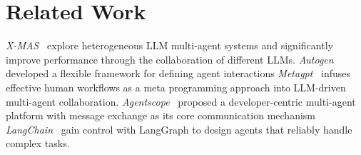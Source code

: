 \documentclass[letterpaper]{article} %
\begin{document}
\section{Related Work}
\textit{X-MAS}~\cite{ye2025x} explore heterogeneous LLM multi-agent systems and significantly improve performance through the collaboration of different LLMs.
\textit{Autogen}~\cite{wu2023autogen} developed a flexible framework for defining agent interactions
\textit{Metagpt}~\citep{hong2023metagpt} infuses effective human workflows as a meta programming approach into LLM-driven multi-agent collaboration.
\textit{Agentscope}~\cite{gao2024agentscope} proposed a developer-centric multi-agent platform with message exchange as its core communication mechanism
\textit{LangChain}~\cite{langgraph2025} gain control with LangGraph to design agents
that reliably handle complex tasks.
\end{document}
